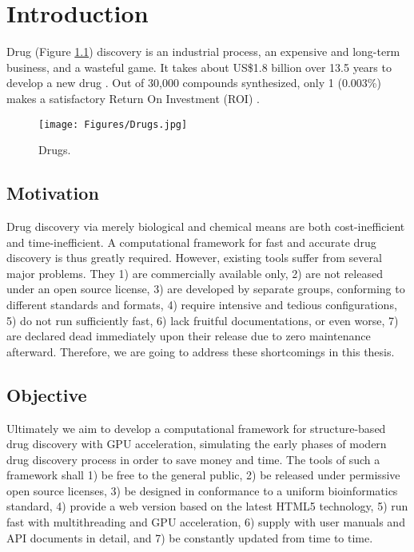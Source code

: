 \chapter{Introduction}

Drug (Figure \ref{fig:Drugs}) discovery is an industrial process, an expensive and long-term business, and a wasteful game. It takes about US\$1.8 billion over 13.5 years to develop a new drug \citep{716}. Out of 30,000 compounds synthesized, only 1 (0.003\%) makes a satisfactory Return On Investment (ROI) \citep{713}.

\begin{figure}
\centering
\texttt{[image: Figures/Drugs.jpg]}
\caption{Drugs.}
\label{fig:Drugs}
\end{figure}

\section{Motivation}

Drug discovery via merely biological and chemical means are both cost-inefficient and time-inefficient. A computational framework for fast and accurate drug discovery is thus greatly required. However, existing tools suffer from several major problems. They 1) are commercially available only, 2) are not released under an open source license, 3) are developed by separate groups, conforming to different standards and formats, 4) require intensive and tedious configurations, 5) do not run sufficiently fast, 6) lack fruitful documentations, or even worse, 7) are declared dead immediately upon their release due to zero maintenance afterward. Therefore, we are going to address these shortcomings in this thesis.

\section{Objective}

Ultimately we aim to develop a computational framework for structure-based drug discovery with GPU acceleration, simulating the early phases of modern drug discovery process in order to save money and time. The tools of such a framework shall 1) be free to the general public, 2) be released under permissive open source licenses, 3) be designed in conformance to a uniform bioinformatics standard, 4) provide a web version based on the latest HTML5 technology, 5) run fast with multithreading and GPU acceleration, 6) supply with user manuals and API documents in detail, and 7) be constantly updated from time to time.

